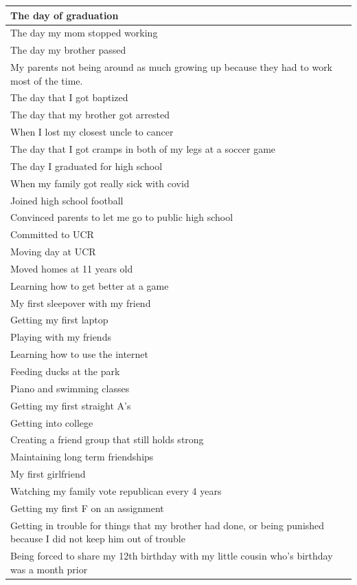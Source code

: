 \documentclass[
  .7em,
  letterpaper,
  DIV=11,
  numbers=noendperiod]{scrartcl}
\begin{document}
\begin{table}
\begin{tabular}{l}
\hline
The day of graduation\\
\hline
The day my mom stopped working\\
\hline
The day my brother passed\\
\hline
My parents not being around as much growing up because they had to work most of the time.\\
\hline
The day that I got baptized\\
\hline
The day that my brother got arrested\\
\hline
When I lost my closest uncle to cancer\\
\hline
The day that I got cramps in both of my legs at a soccer game\\
\hline
The day I graduated for high school\\
\hline
When my family got really sick with covid\\
\hline
Joined high school football\\
\hline
Convinced parents to let me go to public high school\\
\hline
Committed to UCR\\
\hline
Moving day at UCR\\
\hline
Moved homes at 11 years old\\
\hline
Learning how to get better at a game\\
\hline
My first sleepover with my friend\\
\hline
Getting my first laptop\\
\hline
Playing with my friends\\
\hline
Learning how to use the internet\\
\hline
Feeding ducks at the park\\
\hline
Piano and swimming classes\\
\hline
Getting my first straight A's\\
\hline
Getting into college\\
\hline
Creating a friend group that still holds strong\\
\hline
Maintaining long term friendships\\
\hline
My first girlfriend\\
\hline
Watching my family vote republican every 4 years\\
\hline
Getting my first F on an assignment\\
\hline
Getting in trouble for things that my brother had done, or being punished because I did not keep him out of trouble\\
\hline
Being forced to share my 12th birthday with my little cousin who's birthday was a month prior\\

\end{tabular}
\end{table}
\end{document}
